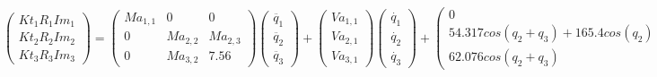 \[
\begin{pmatrix}
Kt_{1}R_{1}Im_{1} \\

Kt_{2}R_{2}Im_{2} \\

Kt_{3}R_{3}Im_{3}
\end{pmatrix} =
\begin{pmatrix}
Ma_{1,1} & 0 & 0 \\

0 & Ma_{2,2} & Ma_{2,3}\\

0 & Ma_{3,2} & 7.56
\end{pmatrix}
\begin{pmatrix}
\ddot{q_{1}} \\

\ddot{q_{2}}  \\

\ddot{q_{3}}
\end{pmatrix} +
\begin{pmatrix}
Va_{1,1}\\

Va_{2,1} \\

Va_{3,1}
\end{pmatrix}
\begin{pmatrix}
\dot{q_{1}} \\

\dot{q_{2}}  \\

\dot{q_{3}}
\end{pmatrix} +
\begin{pmatrix}
0	\\

54.317cos(q_2 + q_3) + 165.4cos(q_2) \\

62.076cos(q_2 + q_3)
\end{pmatrix}\]



